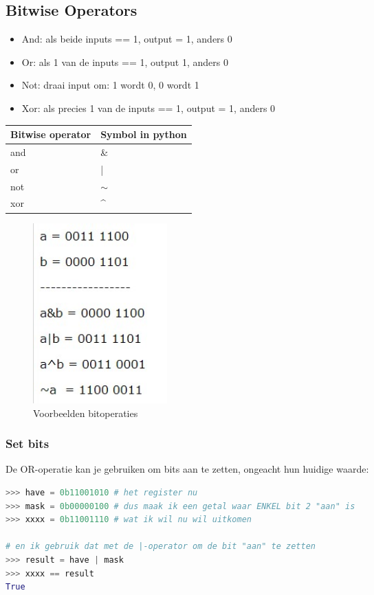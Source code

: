 \documentclass{article}
\begin{document}
\subsection{Bitwise Operators}
\begin{itemize}
    \item And: als beide inputs == 1, output = 1, anders 0
    \item Or: als 1 van de inputs == 1, output 1, anders 0
    \item Not: draai input om: 1 wordt 0, 0 wordt 1
    \item Xor: als precies 1 van de inputs == 1, output = 1, anders 0
\end{itemize}

\begin{table}[H]
\begin{tabular}{|l|l|}
\hline
\multicolumn{1}{|c|}{\textbf{Bitwise operator}} & \multicolumn{1}{c|}{\textbf{Symbol in python}} \\ \hline
and                                             & \&                                             \\ \hline
or                                              & |                                              \\ \hline
not                                             & $\sim$                                         \\ \hline
xor                                             & \textasciicircum{}                             \\ \hline
\end{tabular}
\end{table}

\begin{figure}[H]
    \centering
    \includegraphics[width=0.25\textwidth]{bitoperator-examples.png}
    \caption{Voorbeelden bitoperaties}
\end{figure}

\subsubsection{Set bits}
De OR-operatie kan je gebruiken om bits aan te zetten, ongeacht hun huidige waarde:
\begin{lstlisting}[language=Python]
>>> have = 0b11001010 # het register nu 
>>> mask = 0b00000100 # dus maak ik een getal waar ENKEL bit 2 "aan" is
>>> xxxx = 0b11001110 # wat ik wil nu wil uitkomen

# en ik gebruik dat met de |-operator om de bit "aan" te zetten
>>> result = have | mask 
>>> xxxx == result
True 
\end{lstlisting}
\end{document}
